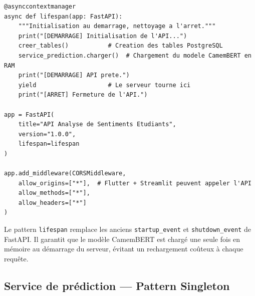 \begin{lstlisting}[style=stylePython, caption={Initialisation FastAPI avec lifespan}, label={lst:fastapi_main}]
@asynccontextmanager
async def lifespan(app: FastAPI):
    """Initialisation au demarrage, nettoyage a l'arret."""
    print("[DEMARRAGE] Initialisation de l'API...")
    creer_tables()           # Creation des tables PostgreSQL
    service_prediction.charger()  # Chargement du modele CamemBERT en RAM
    print("[DEMARRAGE] API prete.")
    yield                    # Le serveur tourne ici
    print("[ARRET] Fermeture de l'API.")

app = FastAPI(
    title="API Analyse de Sentiments Etudiants",
    version="1.0.0",
    lifespan=lifespan
)

app.add_middleware(CORSMiddleware,
    allow_origins=["*"],  # Flutter + Streamlit peuvent appeler l'API
    allow_methods=["*"],
    allow_headers=["*"]
)
\end{lstlisting}

Le pattern \texttt{lifespan} remplace les anciens \texttt{startup\_event}
et \texttt{shutdown\_event} de FastAPI. Il garantit que le modèle CamemBERT
est chargé une seule fois en mémoire au démarrage du serveur, évitant un
rechargement coûteux à chaque requête.

\subsection{Service de prédiction — Pattern Singleton}

